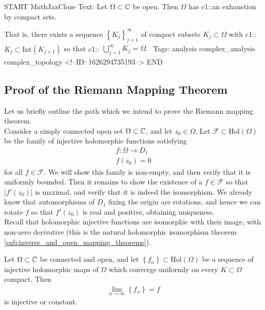 \documentclass{memoir}
\begin{document}
\begin{anki}
START
MathJaxCloze
Text: Let \(\Omega \subset \mathbb{C}\) be open. Then \(\Omega \) has {{c1::an exhaustion by compact sets}}.

That is, there exists a sequence \(\left\{ K_j \right\}_{j=1}^{\infty}\) of compact subsets \(K_j \subset \Omega \) with {{c1::\(K_j \subset \textrm{Int}(K_{j+1})\)}} so that
{{c1::\(\begin{align*}
		\bigcup_{j=1}^{\infty}K_j = \Omega .
	\end{align*}\)}}
Tags: analysis complex_analysis complex_topology
<!--ID: 1626294735193-->
END
\end{anki}


\subsection{Proof of the Riemann Mapping Theorem}
\label{sub:proof_of_the_riemann_mapping_theorem}

Let us briefly outline the path which we intend to prove the Riemann mapping theorem.\\

Consider a simply connected open set \(\Omega \subset \mathbb{C}\), and let \(z_0 \in \Omega \). Let \(\mathcal{F}\subset \textrm{Hol}(\Omega )\) be the family of injective holomorphic functions satisfying
\begin{align*}
	f:\Omega \to D_1\\
	f(z_0) = 0
\end{align*}
for all \(f \in \mathcal{F}\). We will show this family is non-empty, and then verify that it is uniformly bounded. Then it remains to show the existence of a \(f \in \mathcal{F}\) so that \(\left| f'(z_0) \right| \) is maximal, and verify that it is indeed the isomorphism. We already know that automorphisms of \(D_1\) fixing the origin are rotations, and hence we can rotate \(f\) so that \(f'(z_0)\) is real and positive, obtaining uniqueness.\\

Recall that holomorphic injective functions are isomorphic with their image, with non-zero derivative (this is the natural holomorphic isomorphism theorem \ref{sub:inverse_and_open_mapping_theorems}).

\begin{lemma}
\label{lemma:inj_or_const}
	Let \(\Omega \subset \mathbb{C}\) be connected and open, and let \(\left\{ f_n \right\} \subset \textrm{Hol}(\Omega )\) be a sequence of injective holomorphic maps of \(\Omega \) which converge uniformly on every \(K\subset \Omega \) compact. Then
	\begin{align*}
		\lim_{n \to \infty} \left\{ f_n \right\} = f
	\end{align*}
	is injective or constant.
\end{lemma}
\end{document}
